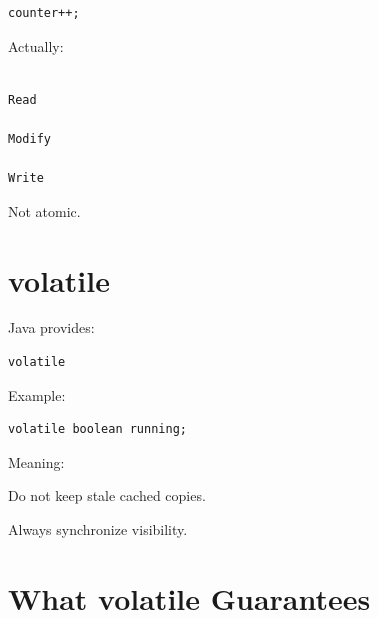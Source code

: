 \documentclass[11pt,a4paper]{book}
\begin{document}
\begin{verbatim} 
counter++;
\end{verbatim}


Actually:

\begin{verbatim}

Read

Modify

Write

\end{verbatim}


Not atomic.


\section{volatile}

Java provides:

\begin{verbatim} 
volatile
\end{verbatim}


Example:

\begin{verbatim} 
volatile boolean running;
\end{verbatim}


Meaning:


Do not keep stale cached copies.


Always synchronize visibility.


\section{What volatile Guarantees}

\end{document}
